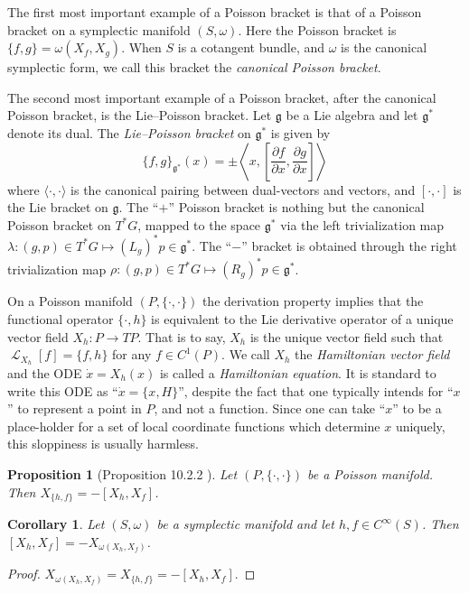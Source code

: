 \documentclass[12pt]{amsart}
\newcommand{\pder}[2]{\ensuremath{\frac{\partial #1}{\partial #2}}}
\newtheorem{prop}[thm]{Proposition}
\newtheorem{cor}[thm]{Corollary}
\DeclareMathOperator{\lie}{\mathcal{L}}
\begin{document}
The first most important example of a Poisson bracket is
that of a Poisson bracket on a symplectic manifold $(S,\omega)$.
Here the Poisson bracket is $\{ f , g \} = \omega( X_f , X_g )$.
When $S$ is a cotangent bundle, and $\omega$ is the canonical
symplectic form, we call this bracket the \emph{canonical Poisson
bracket}.

The second most important example of a Poisson bracket,
after the canonical Poisson bracket,
is the Lie--Poisson bracket.  Let $\mathfrak{g}$ be a Lie algebra
and let $\mathfrak{g}^*$ denote its dual.
The \emph{Lie--Poisson bracket} on $\mathfrak{g}^*$ is given 
by
\begin{equation}
  \{ f , g \}_{\mathfrak{g}^*}( x ) = \pm
  \left \langle x , \left[ \pder{f}{x} , \pder{g}{x} \right] \right \rangle
  \label{eq:Lie-Poisson}
\end{equation}
where $\langle \cdot , \cdot \rangle$ is the canonical pairing between
dual-vectors and vectors, and $[ \cdot , \cdot ]$ is the Lie bracket
on $\mathfrak{g}$.
The ``$+$'' Poisson bracket is nothing but the canonical Poisson bracket on $T^*G$,
mapped to the space $\mathfrak{g}^*$ via the left trivialization map $\lambda: (g,p) \in T^*G \mapsto (L_g)^*p \in \mathfrak{g}^*$.
The ``$-$'' bracket is obtained through the right trivialization map
$\rho:(g,p) \in T^*G \mapsto (R_g)^*p \in \mathfrak{g}^*$.

On a Poisson manifold $(P,\{ \cdot , \cdot \})$
the derivation property implies that the functional operator
$\{ \cdot , h \}$ is equivalent
to the Lie derivative operator of a unique vector field $X_h:P \to TP$.
That is to say, $X_h$ is the unique vector field such that $\lie_{X_h}[f] = \{ f , h \}$ for any $f \in C^1(P)$.
We call $X_h$ the \emph{Hamiltonian vector field} and the ODE $\dot{x} = X_h(x)$ is called a \emph{Hamiltonian equation}.
It is standard to write this ODE as ``$\dot{x} = \{ x , H\}$'',
despite the fact that one typically intends for ``$x$'' to represent
a point in $P$, and not a function.
Since one can take ``$x$'' to be a place-holder for a set of
local coordinate functions which determine $x$ uniquely, this
sloppiness is usually harmless.

\begin{prop}[Proposition 10.2.2 \cite{MandS}] \label{prop:Lie_hom}
  Let $(P,\{ \cdot , \cdot \})$ be a Poisson manifold.
  Then $X_{ \{ h ,f \} } = - [X_h , X_f ]$.
\end{prop}

\begin{cor} \label{cor:Lie_hom}
  Let $(S,\omega)$ be a symplectic manifold
  and let $h,f \in C^{\infty}(S)$.
  Then $[X_h , X_f] = -X_{\omega(X_h,X_f) }$.
\end{cor}
\begin{proof}
  $X_{\omega(X_h,X_f)} = X_{ \{h,f\} } = -[X_h , X_f]$.
\end{proof}
\end{document}
